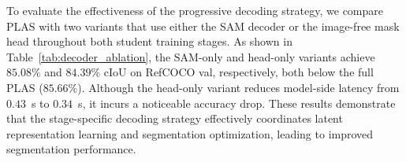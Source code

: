 To evaluate the effectiveness of the progressive decoding strategy, we compare PLAS with two variants that use either the SAM decoder or the image-free mask head throughout both student training stages. As shown in Table~\ref{tab:decoder_ablation}, the SAM-only and head-only variants achieve $85.08\%$ and $84.39\%$ cIoU on RefCOCO val, respectively, both below the full PLAS ($85.66\%$). Although the head-only variant reduces model-side latency from $0.43$~s to $0.34$~s, it incurs a noticeable accuracy drop. These results demonstrate that the stage-specific decoding strategy effectively coordinates latent representation learning and segmentation optimization, leading to improved segmentation performance.


\begin{table}[!t]
  \centering
  \scriptsize
  \setlength{\tabcolsep}{1.9pt}
  \renewcommand{\arraystretch}{0.96}
  \caption{Ablation of the decoding model. \emph{SAM path} decodes both student stages through the SAM mask decoder; \emph{head path} decodes both through the Stage-I image-free head. Time is model-side latency. cIoU (\%).}
  \label{tab:decoder_ablation}
\end{table}

